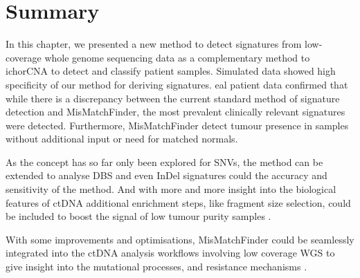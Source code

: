 \section{Summary}
\label{mmf-sec:summary}
In this chapter, we presented a new method to detect signatures from low-coverage whole genome sequencing data as a complementary method to ichorCNA to detect and classify patient samples. Simulated data showed  high specificity of our method for deriving signatures. eal patient data confirmed that while there is a discrepancy between the current standard method of signature detection and MisMatchFinder, the most prevalent clinically relevant signatures were detected. Furthermore, MisMatchFinder  detect tumour presence in samples without additional input or need for matched normals.

As the concept has so far only been explored for SNVs, the method can be extended to analyse DBS and even InDel signatures could  the accuracy and sensitivity of the method.
And with more and more insight into the biological features of ctDNA additional enrichment steps, like fragment size selection, could be included to boost the signal of low tumour purity samples \cite{Mouliere2018,Markus2022}.

With some improvements and optimisations, MisMatchFinder could be seamlessly integrated into the ctDNA analysis workflows involving low coverage WGS to give insight into the mutational processes, and resistance mechanisms \cite{Homburger2019,Chen2021}.
